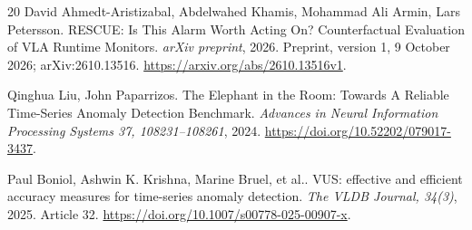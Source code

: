 \begin{thebibliography}{20}
 David Ahmedt-Aristizabal, Abdelwahed Khamis, Mohammad Ali Armin, Lars Petersson. {RESCUE: Is This Alarm Worth Acting On? Counterfactual Evaluation of VLA Runtime Monitors}. \emph{arXiv preprint}, 2026. Preprint, version 1, 9 October 2026; arXiv:2610.13516. \url{https://arxiv.org/abs/2610.13516v1}.

 Qinghua Liu, John Paparrizos. {The Elephant in the Room: Towards A Reliable Time-Series Anomaly Detection Benchmark}. \emph{Advances in Neural Information Processing Systems 37, 108231--108261}, 2024. \url{https://doi.org/10.52202/079017-3437}.

 Paul Boniol, Ashwin K. Krishna, Marine Bruel, et al.. {VUS: effective and efficient accuracy measures for time-series anomaly detection}. \emph{The VLDB Journal, 34(3)}, 2025. Article 32. \url{https://doi.org/10.1007/s00778-025-00907-x}.

\end{thebibliography}

